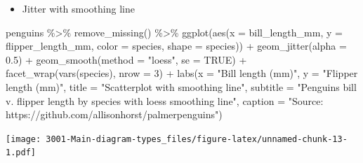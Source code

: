 \documentclass[
]{book}
\newenvironment{Shaded}{\begin{snugshade}}{\end{snugshade}}
\newcommand{\AttributeTok}[1]{\textcolor[rgb]{0.77,0.63,0.00}{#1}}
\newcommand{\ConstantTok}[1]{\textcolor[rgb]{0.00,0.00,0.00}{#1}}
\newcommand{\DecValTok}[1]{\textcolor[rgb]{0.00,0.00,0.81}{#1}}
\newcommand{\FloatTok}[1]{\textcolor[rgb]{0.00,0.00,0.81}{#1}}
\newcommand{\FunctionTok}[1]{\textcolor[rgb]{0.00,0.00,0.00}{#1}}
\newcommand{\NormalTok}[1]{#1}
\newcommand{\SpecialCharTok}[1]{\textcolor[rgb]{0.00,0.00,0.00}{#1}}
\newcommand{\StringTok}[1]{\textcolor[rgb]{0.31,0.60,0.02}{#1}}
\providecommand{\tightlist}{%
  \setlength{\itemsep}{0pt}\setlength{\parskip}{0pt}}
\begin{document}
\begin{itemize}
\tightlist
\item
  Jitter with smoothing line
\end{itemize}

\begin{Shaded}
\begin{Highlighting}[]
\NormalTok{penguins }\SpecialCharTok{\%\textgreater{}\%}
    \FunctionTok{remove\_missing}\NormalTok{() }\SpecialCharTok{\%\textgreater{}\%}
    \FunctionTok{ggplot}\NormalTok{(}\FunctionTok{aes}\NormalTok{(}\AttributeTok{x =}\NormalTok{ bill\_length\_mm, }\AttributeTok{y =}\NormalTok{ flipper\_length\_mm,}
              \AttributeTok{color =}\NormalTok{ species, }\AttributeTok{shape =}\NormalTok{ species)) }\SpecialCharTok{+}
    \FunctionTok{geom\_jitter}\NormalTok{(}\AttributeTok{alpha =} \FloatTok{0.5}\NormalTok{) }\SpecialCharTok{+}
    \FunctionTok{geom\_smooth}\NormalTok{(}\AttributeTok{method =} \StringTok{"loess"}\NormalTok{, }\AttributeTok{se =} \ConstantTok{TRUE}\NormalTok{) }\SpecialCharTok{+}
    \FunctionTok{facet\_wrap}\NormalTok{(}\FunctionTok{vars}\NormalTok{(species), }\AttributeTok{nrow =} \DecValTok{3}\NormalTok{) }\SpecialCharTok{+}
    \FunctionTok{labs}\NormalTok{(}\AttributeTok{x =} \StringTok{"Bill length (mm)"}\NormalTok{, }
         \AttributeTok{y =} \StringTok{"Flipper length (mm)"}\NormalTok{,}
        \AttributeTok{title =} \StringTok{"Scatterplot with smoothing line"}\NormalTok{, }
        \AttributeTok{subtitle =} \StringTok{"Penguins bill v. flipper length by species with loess smoothing line"}\NormalTok{,}
        \AttributeTok{caption =} \StringTok{"Source: https://github.com/allisonhorst/palmerpenguins"}\NormalTok{)}
\end{Highlighting}
\end{Shaded}

\texttt{[image: 3001-Main-diagram-types\_files/figure-latex/unnamed-chunk-13-1.pdf]}
\end{document}
